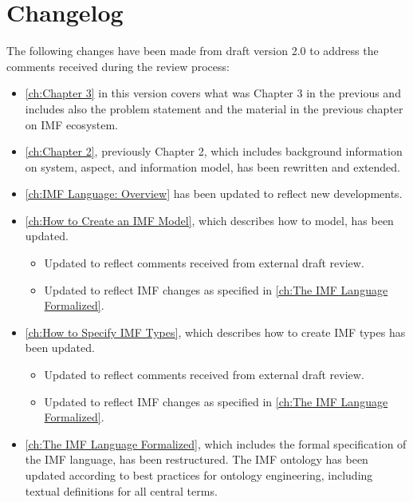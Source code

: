 \documentclass[../main.tex]{subfiles}
\begin{document}
\chapter{Changelog}

The following changes have been made from draft version 2.0 to address
the comments received during the review process:


\begin{itemize}
\item \autoref{ch:Chapter 3} in this version covers what was Chapter 3 in the previous and includes also the problem statement and the material in the previous chapter on IMF ecosystem.
  \item \autoref{ch:Chapter 2}, previously Chapter 2, which includes background information on system, aspect, and information model, has been rewritten 
        and extended.
        \item \autoref{ch:IMF Language: Overview} has been updated to reflect new developments.
  \item \autoref{ch:How to Create an IMF Model}, which describes how to model, has been updated.

        \begin{itemize}
          \item Updated to reflect comments received from external draft review.
          \item Updated to reflect IMF changes as specified in \autoref{ch:The IMF Language Formalized}.
        \end{itemize}
  \item \autoref{ch:How to Specify IMF Types}, which describes how to create IMF types has been updated.

        \begin{itemize}
          \item Updated to reflect comments received from external draft review.
          \item Updated to reflect IMF changes as specified in \autoref{ch:The IMF Language Formalized}.
        \end{itemize}
        \item \autoref{ch:The IMF Language Formalized}, which includes the formal specification of the IMF language, has been restructured.
  The IMF ontology has been updated according to best practices for ontology engineering, including textual definitions for all central terms. 
  
  
        
        
        \end{itemize}
\end{document}
